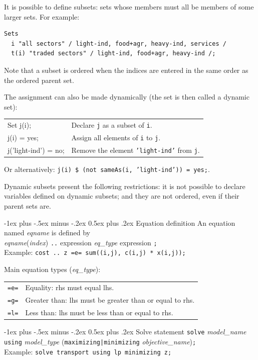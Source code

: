 \documentclass[10pt,landscape,a4paper]{article}
\makeatletter
\renewcommand{\section}{\@startsection{section}{1}{0mm}%
                                {-1ex plus -.5ex minus -.2ex}%
                                {0.5ex plus .2ex}%
                                {\color{blue}\normalfont\large\bfseries}}
\makeatother
\begin{document}
\begin{multicols}{2}
It is possible to define subsets: sets whose members must all be members of some
larger sets. For example:\\
\begin{verbatim}
Sets
  i "all sectors" / light-ind, food+agr, heavy-ind, services /
  t(i) "traded sectors" / light-ind, food+agr, heavy-ind /;
\end{verbatim}
Note that a subset is ordered when the indices are entered in the same order as
the ordered parent set.

The assignment can also be made dynamically (the set is then called a dynamic
set):
\begin{tabularx}{\columnwidth}{@{}>{\ttfamily}l>{\raggedright\arraybackslash}X@{}}
Set j(i);& Declare \texttt{j} as a subset of \texttt{i}. \\
j(i) = yes;& Assign all elements of \texttt{i} to \texttt{j}.\\
j('light-ind') = no;& Remove the element \texttt{'light-ind'} from \texttt{j}.
\end{tabularx}
Or alternatively: \texttt{j(i) \$ (not sameAs(i, 'light-ind')) = yes;}.

Dynamic subsets present the following restrictions: it is not possible to
declare variables defined on dynamic subsets; and they are not ordered, even if
their parent sets are.

\section{Equation definition}
An equation named \emph{eqname} is defined by\\
\emph{eqname}(\emph{index}) \verb!..! expression \emph{eq\_type} expression \verb!;!\\
Example: \verb!cost .. z =e= sum((i,j), c(i,j) * x(i,j));!

Main equation types (\emph{eq\_type}):\\
\begin{tabular}{@{}ll@{}}
  \verb!=e=! & Equality: rhs must equal lhs.\\
  \verb!=g=! & Greater than: lhs must be greater than or equal to rhs.\\
  \verb!=l=! & Less than: lhs must be less than or equal to rhs.
\end{tabular}

\columnbreak{}
\section{Solve statement}
\verb!solve! \emph{model\_name} \verb!using! \emph{model\_type} (\verb!maximizing|minimizing! \emph{objective\_name})\verb!;!\\
Example: \verb!solve transport using lp minimizing z;!


\end{multicols}
\end{document}
